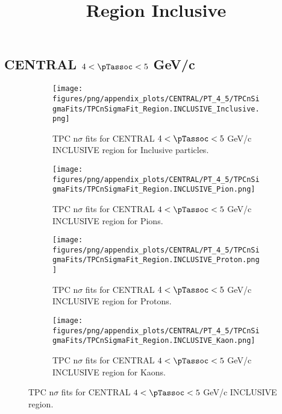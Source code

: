     
            \subsection*{CENTRAL $4 < \pTassoc < 5$ GeV/c}
            \begin{figure}[H]
                \title{Region Inclusive}
                \begin{subfigure}[b]{0.5\textwidth}
                    \centering
                    \texttt{[image: figures/png/appendix\_plots/CENTRAL/PT\_4\_5/TPCnSigmaFits/TPCnSigmaFit\_Region.INCLUSIVE\_Inclusive.png]}
                    \caption{TPC n$\sigma$ fits for CENTRAL $4 < \pTassoc < 5$ GeV/c INCLUSIVE region for Inclusive particles.}
                    \label{fig:appendix_CENTRAL_$4 < \pTassoc < 5$ GeV/c_INCLUSIVE_Inclusive}
                \end{subfigure}
                \begin{subfigure}[b]{0.5\textwidth}
                    \centering
                    \texttt{[image: figures/png/appendix\_plots/CENTRAL/PT\_4\_5/TPCnSigmaFits/TPCnSigmaFit\_Region.INCLUSIVE\_Pion.png]}
                    \caption{TPC n$\sigma$ fits for CENTRAL $4 < \pTassoc < 5$ GeV/c INCLUSIVE region for Pions.}
                    \label{fig:appendix_CENTRAL_$4 < \pTassoc < 5$ GeV/c_INCLUSIVE_Pion}
                \end{subfigure}
                \begin{subfigure}[b]{0.5\textwidth}
                    \centering
                    \texttt{[image: figures/png/appendix\_plots/CENTRAL/PT\_4\_5/TPCnSigmaFits/TPCnSigmaFit\_Region.INCLUSIVE\_Proton.png]}
                    \caption{TPC n$\sigma$ fits for CENTRAL $4 < \pTassoc < 5$ GeV/c INCLUSIVE region for Protons.}
                    \label{fig:appendix_CENTRAL_$4 < \pTassoc < 5$ GeV/c_INCLUSIVE_Proton}
                \end{subfigure}
                \begin{subfigure}[b]{0.5\textwidth}
                    \centering
                    \texttt{[image: figures/png/appendix\_plots/CENTRAL/PT\_4\_5/TPCnSigmaFits/TPCnSigmaFit\_Region.INCLUSIVE\_Kaon.png]}
                    \caption{TPC n$\sigma$ fits for CENTRAL $4 < \pTassoc < 5$ GeV/c INCLUSIVE region for Kaons.}
                    \label{fig:appendix_CENTRAL_$4 < \pTassoc < 5$ GeV/c_INCLUSIVE_Kaon}
                \end{subfigure}
                \caption{TPC n$\sigma$ fits for CENTRAL $4 < \pTassoc < 5$ GeV/c INCLUSIVE region.}
                \label{fig:appendix_CENTRAL_$4 < \pTassoc < 5$ GeV/c_INCLUSIVE}
            \end{figure}
